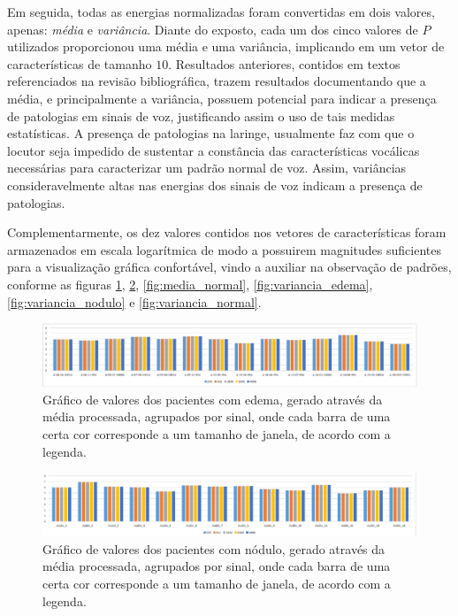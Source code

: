 \documentclass[a4paper,12pt,oneside]{report}
\begin{document}
\par Em seguida, todas as energias normalizadas foram convertidas em dois valores, apenas: \emph{m\'{e}dia} e \emph{vari\^{a}ncia}. Diante do exposto, cada um dos cinco valores de $P$ utilizados proporcionou uma m\'{e}dia e uma vari\^{a}ncia, implicando em um vetor de caracter\'{i}sticas de tamanho $10$. Resultados anteriores, contidos em textos referenciados na revis\~{a}o bibliogr\'{a}fica, trazem resultados documentando que a m\'{e}dia, e principalmente a vari\^{a}ncia, possuem potencial para indicar a presen\c{c}a de patologias em sinais de voz, justificando assim o uso de tais medidas estat\'{i}sticas. A presen\c{c}a de patologias na laringe, usualmente faz com que o locutor seja impedido de sustentar a const\^{a}ncia das caracter\'{i}sticas voc\'{a}licas necess\'{a}rias para caracterizar um padr\~{a}o normal de voz. Assim, vari\^{a}ncias consideravelmente altas nas energias dos sinais de voz indicam a presen\c{c}a de patologias. 
\\
\par Complementarmente, os dez valores contidos nos vetores de caracter\'{i}sticas foram armazenados em escala logar\'{i}tmica de modo a possuirem magnitudes suficientes para a visualiza\c{c}\~{a}o gr\'{a}fica confort\'{a}vel, vindo a auxiliar na observa\c{c}\~{a}o de padr\~{o}es, conforme as figuras \ref{fig:media_edema}, \ref{fig:media_nodulo}, \ref{fig:media_normal}, \ref{fig:variancia_edema}, \ref{fig:variancia_nodulo} e \ref{fig:variancia_normal}.
\begin{figure}[H]
\includegraphics[width=1\textwidth, height=0.15\paperheight]{media_edema}
	\caption{Gr\'{a}fico de valores dos pacientes com edema, gerado atrav\'{e}s da m\'{e}\-dia pro\-ces\-sa\-da, agrupados por sinal, onde cada barra de uma certa cor corresponde a um tamanho de janela, de acordo com a legenda.}
	\label{fig:media_edema}
\end{figure}
\begin{figure}[H]
\includegraphics[width=1\textwidth, height=0.15\paperheight]{media_nodulo}
	\caption{Gr\'{a}fico de valores dos pacientes com n\'{o}dulo, gerado atrav\'{e}s da m\'{e}\-dia pro\-ces\-sa\-da, agrupados por sinal, onde cada barra de uma certa cor corresponde a um tamanho de janela, de acordo com a legenda.}
	\label{fig:media_nodulo}
\end{figure}
\end{document}
